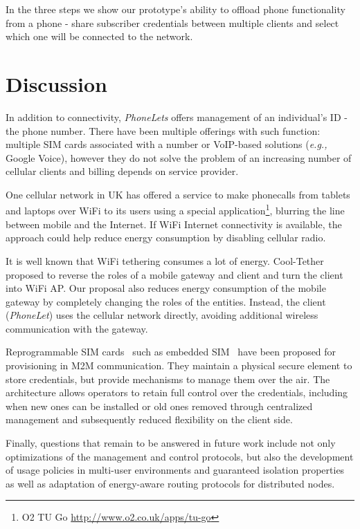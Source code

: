 \documentclass{sig-alternate-2013}
\providecommand{\eg}{\emph{e.g.,} }
\begin{document}
In the three steps we show our prototype's ability to offload phone functionality from a phone - share subscriber credentials between multiple clients and select which one will be connected to the network.

\section{Discussion}

In addition to connectivity, \emph{PhoneLets} offers management of an individual's ID - the phone number. There have been multiple offerings with such function: multiple SIM cards associated with a number or VoIP-based solutions (\eg Google Voice), however they do not solve the problem of an increasing number of cellular clients and billing depends on service provider.

One cellular network in UK has offered a service to make phonecalls from tablets and laptops over WiFi to its users using a special application\footnote{O2 TU Go \url{http://www.o2.co.uk/apps/tu-go}}, blurring the line between mobile and the Internet. If WiFi Internet connectivity is available, the approach could help reduce energy consumption by disabling cellular radio.

It is well known that WiFi tethering consumes a lot of energy. Cool-Tether~\cite{Sharma:2009fd} proposed to reverse the roles of a mobile gateway and client and turn the client into WiFi AP. Our proposal also reduces energy consumption of the mobile gateway by completely changing the roles of the entities. Instead, the client (\emph{PhoneLet}) uses the cellular network directly, avoiding additional wireless communication with the gateway.

Reprogrammable SIM cards~\cite{OFcom:2012tx} such as embedded SIM~\cite{Association:2013ub} have been proposed for provisioning in M2M communication. They maintain a physical secure element to store credentials, but provide mechanisms to manage them over the air. The architecture allows operators to retain full control over the credentials, including when new ones can be installed or old ones removed through centralized management and subsequently reduced flexibility on the client side.

Finally, questions that remain to be answered in future work include not only optimizations of the management and control protocols, but also the development of usage policies in multi-user environments and guaranteed isolation properties as well as adaptation of energy-aware routing protocols for distributed nodes.
\end{document}
